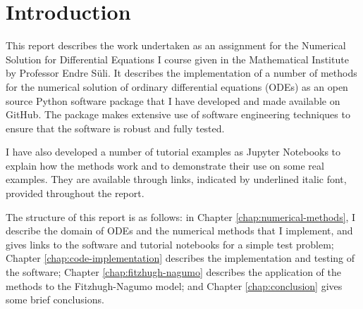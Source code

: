 \chapter{Introduction}
\label{chap:introduction}

This report describes the work undertaken as an assignment for the Numerical Solution for Differential Equations \RN{1} course given in the Mathematical Institute by Professor Endre S\"{u}li. It describes the implementation of a number of methods for the numerical solution of ordinary differential equations (ODEs) as an open source Python software package that I have developed and made available on GitHub. The package makes extensive use of software engineering techniques to ensure that the software is robust and fully tested.

I have also developed a number of tutorial examples as Jupyter Notebooks to explain how the methods work and to demonstrate their use on some real examples. They are available through links, indicated by underlined italic font, provided throughout the report.

The structure of this report is as follows: in Chapter \ref{chap:numerical-methods}, I describe the domain of ODEs and the numerical methods that I implement, and gives links to the software and tutorial notebooks for a simple test problem; Chapter \ref{chap:code-implementation} describes the implementation and testing of the software; Chapter \ref{chap:fitzhugh-nagumo} describes the application of the methods to the Fitzhugh-Nagumo model; and Chapter \ref{chap:conclusion} gives some brief conclusions.

